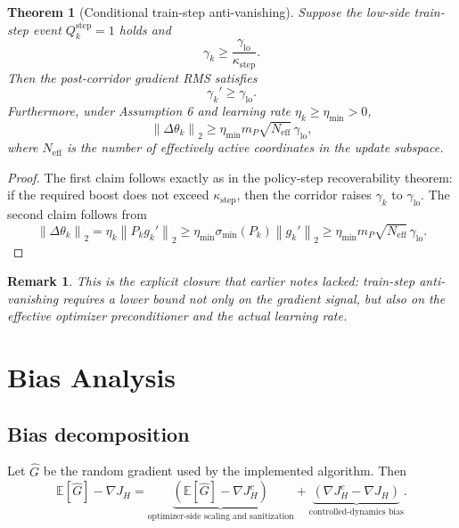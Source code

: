 \documentclass[11pt]{article}
\newtheorem{theorem}{Theorem}
\newtheorem{remark}{Remark}
\newcommand{\E}{\mathbb{E}}
\newcommand{\1}{\mathbf{1}}
\newcommand{\norm}[1]{\left\lVert #1 \right\rVert}
\begin{document}
\begin{theorem}[Conditional train-step anti-vanishing]
Suppose the low-side train-step event $Q_k^{\mathrm{step}}=1$ holds and
\begin{equation}
  \gamma_k \ge \frac{\gamma_{\mathrm{lo}}}{\kappa_{\mathrm{step}}}.
\end{equation}
Then the post-corridor gradient RMS satisfies
\begin{equation}
  \gamma_k' \ge \gamma_{\mathrm{lo}}.
\end{equation}
Furthermore, under Assumption 6 and learning rate $\eta_k \ge \eta_{\min} > 0$,
\begin{equation}
  \norm{\Delta \theta_k}_2
  \ge
  \eta_{\min} m_P \sqrt{N_{\mathrm{eff}}}\,\gamma_{\mathrm{lo}},
\end{equation}
where $N_{\mathrm{eff}}$ is the number of effectively active coordinates in the update subspace.
\end{theorem}

\begin{proof}
The first claim follows exactly as in the policy-step recoverability theorem: if the required boost does not exceed $\kappa_{\mathrm{step}}$, then the corridor raises $\gamma_k$ to $\gamma_{\mathrm{lo}}$. The second claim follows from
\[
  \norm{\Delta \theta_k}_2
  =
  \eta_k \norm{P_k g_k'}_2
  \ge
  \eta_{\min} \sigma_{\min}(P_k)\norm{g_k'}_2
  \ge
  \eta_{\min} m_P \sqrt{N_{\mathrm{eff}}}\,\gamma_{\mathrm{lo}}.
\]
\end{proof}

\begin{remark}
This is the explicit closure that earlier notes lacked: train-step anti-vanishing requires a lower bound not only on the gradient signal, but also on the effective optimizer preconditioner and the actual learning rate.
\end{remark}

\section{Bias Analysis}
\subsection{Bias decomposition}
Let $\widehat{G}$ be the random gradient used by the implemented algorithm. Then
\begin{equation}
  \E[\widehat{G}] - \nabla J_H
  =
  \underbrace{\left(\E[\widehat{G}] - \nabla J_H^c\right)}_{\text{optimizer-side scaling and sanitization}}
  +
  \underbrace{\left(\nabla J_H^c - \nabla J_H\right)}_{\text{controlled-dynamics bias}}.
\end{equation}
\end{document}
